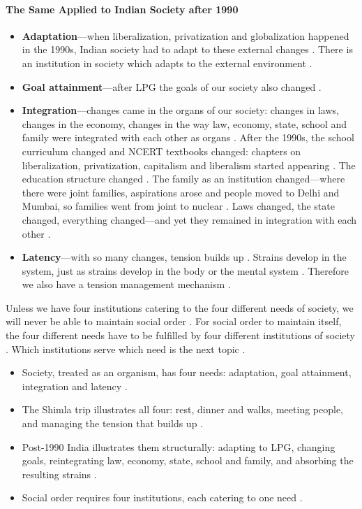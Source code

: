\paragraph{The Same Applied to Indian Society after 1990}
\begin{itemize}
    \item \textbf{Adaptation}---when liberalization, privatization and globalization happened in the 1990s, Indian society had to adapt to these external changes . There is an institution in society which adapts to the external environment .
    \item \textbf{Goal attainment}---after LPG the goals of our society also changed .
    \item \textbf{Integration}---changes came in the organs of our society: changes in laws, changes in the economy, changes in the way law, economy, state, school and family were integrated with each other as organs . After the 1990s, the school curriculum changed and NCERT textbooks changed: chapters on liberalization, privatization, capitalism and liberalism started appearing . The education structure changed . The family as an institution changed---where there were joint families, aspirations arose and people moved to Delhi and Mumbai, so families went from joint to nuclear . Laws changed, the state changed, everything changed---and yet they remained in integration with each other .
    \item \textbf{Latency}---with so many changes, tension builds up . Strains develop in the system, just as strains develop in the body or the mental system . Therefore we also have a tension management mechanism .
\end{itemize}

\begin{KeyConcept}
Unless we have four institutions catering to the four different needs of society, we will never be able to maintain social order .
For social order to maintain itself, the four different needs have to be fulfilled by four different institutions of society . Which institutions serve which need is the next topic .
\end{KeyConcept}

\begin{QuickRevision}
\begin{itemize}
    \item Society, treated as an organism, has four needs: adaptation, goal attainment, integration and latency .
    \item The Shimla trip illustrates all four: rest, dinner and walks, meeting people, and managing the tension that builds up .
    \item Post-1990 India illustrates them structurally: adapting to LPG, changing goals, reintegrating law, economy, state, school and family, and absorbing the resulting strains .
    \item Social order requires four institutions, each catering to one need .
\end{itemize}
\end{QuickRevision}

